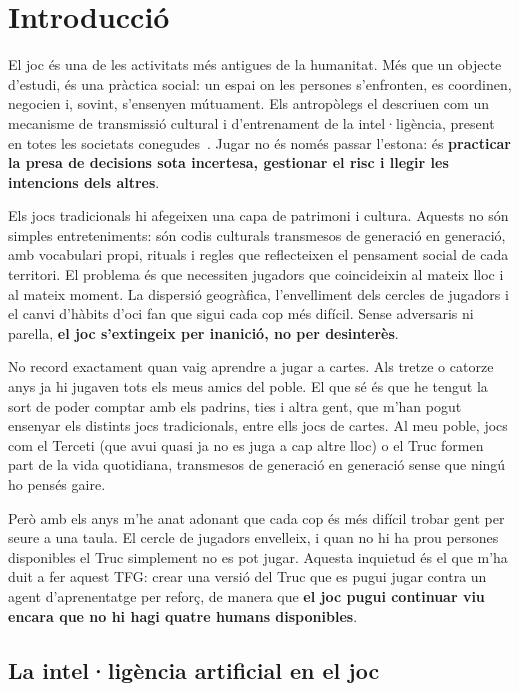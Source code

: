 
\chapter{Introducció}
\label{cap:introduccio}

El joc és una de les activitats més antigues de la humanitat. Més que un objecte
d'estudi, és una pràctica social: un espai on les persones s'enfronten, es coordinen,
negocien i, sovint, s'ensenyen mútuament. Els antropòlegs el descriuen com un
mecanisme de transmissió cultural i d'entrenament de la intel·ligència, present en
totes les societats conegudes~\cite{huizinga1938homo}. Jugar no és només passar
l'estona: és \textbf{practicar la presa de decisions sota incertesa, gestionar el risc i
llegir les intencions dels altres}.

Els jocs tradicionals hi afegeixen una capa de patrimoni i cultura. Aquests no són
simples entreteniments: són codis culturals transmesos de generació en generació,
amb vocabulari propi, rituals i regles que reflecteixen el pensament social de cada
territori. El problema és que necessiten jugadors que coincideixin al mateix lloc i
al mateix moment. La dispersió geogràfica, l'envelliment dels cercles de jugadors i
el canvi d'hàbits d'oci fan que sigui cada cop més difícil. Sense adversaris ni
parella, \textbf{el joc s'extingeix per inanició, no per desinterès}.

No record exactament quan vaig aprendre a jugar a cartes. Als tretze o catorze anys
ja hi jugaven tots els meus amics del poble. El que sé és que he tengut la sort de poder comptar amb els padrins, ties i altra gent, que m'han pogut ensenyar els distints jocs tradicionals, entre ells jocs de cartes. Al meu poble, jocs com el Terceti (que avui quasi ja no es juga a cap altre lloc) o
el Truc formen part de la vida quotidiana, transmesos de generació en generació
sense que ningú ho pensés gaire.

Però amb els anys m'he anat adonant que cada cop és més difícil trobar gent per
seure a una taula. El cercle de jugadors envelleix, i quan no hi ha prou persones
disponibles el Truc simplement no es pot jugar. Aquesta inquietud és el que m'ha
duit a fer aquest \ac{TFG}: crear una versió del Truc que es pugui jugar contra
un agent d'aprenentatge per reforç, de manera que \textbf{el joc pugui continuar viu encara
que no hi hagi quatre humans disponibles}.

\section{La intel·ligència artificial en el joc}


